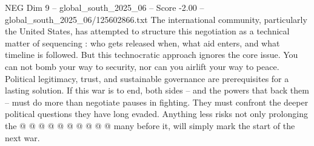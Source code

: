 \begin{textsample}{NEG Dim 9 – global\_south\_2025\_06 – Score -2.00 – global\_south\_2025\_06/125602866.txt}
The international community, particularly the United States, has attempted to structure this negotiation as a technical matter of sequencing : who gets released when, what aid enters, and what timeline is followed.
But this technocratic approach ignores the core issue.
You can not bomb your way to security, nor can you airlift your way to peace.
Political legitimacy, trust, and sustainable governance are prerequisites for a lasting solution.
If this war is to end, both sides -- and the powers that back them -- must do more than negotiate pauses in fighting.
They must confront the deeper political questions they have long evaded.
Anything less risks not only prolonging the @ @ @ @ @ @ @ @ @ @ many before it, will simply mark the start of the next war.

\end{textsample}
